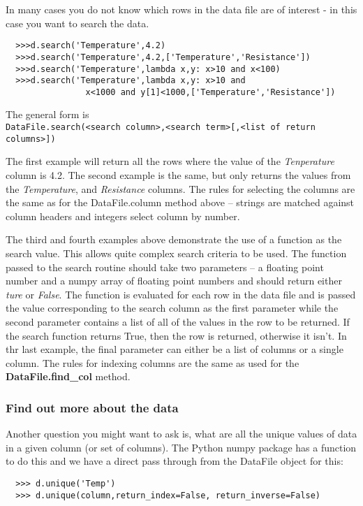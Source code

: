 \documentclass[a4paper,11pt]{scrartcl}
\begin{document}
In many cases you do not know which rows in the data file are of interest - in this case you want to search the data.
\begin{verbatim}
  >>>d.search('Temperature',4.2)
  >>>d.search('Temperature',4.2,['Temperature','Resistance'])
  >>>d.search('Temperature',lambda x,y: x>10 and x<100)
  >>>d.search('Temperature',lambda x,y: x>10 and
                x<1000 and y[1]<1000,['Temperature','Resistance'])
\end{verbatim}
The general form is \\\verb:DataFile.search(<search column>,<search term>[,<list of return columns>]):

The first example will return all the rows where the value of the \textit{Tenperature} column is 4.2. The second example is the same, but only returns the values from the \textit{Temperature}, and \textit{Resistance} columns. The rules for selecting the columns are the same as for the DataFile.column method above -- strings are matched against column headers and integers select column by number.

The third and fourth examples above demonstrate the use of a function as the search value. This allows quite complex search criteria to be used. The function passed to the search routine should take two parameters -- a floating point number and a numpy array of floating point numbers and should return either \textit{ture} or \textit{False}. The function is evaluated for each row in the data file and is passed the value corresponding to the search column as the first parameter while the second parameter contains a list of all of the values in the row to be returned. If the search function returns True, then the row is returned, otherwise it isn't. In thr last example, the final parameter can either be a list of columns or a single column. The rules for indexing columns are the same as used for the \textbf{DataFile.find\_col} method.

\subsubsection{Find out more about the data}

Another question you might want to ask is, what are all the unique
values of data in a given column (or set of columns). The Python numpy
package has a function to do this and we have a direct pass through
from the DataFile object for this:

\begin{verbatim}
  >>> d.unique('Temp')
  >>> d.unique(column,return_index=False, return_inverse=False)
\end{verbatim}
\end{document}
